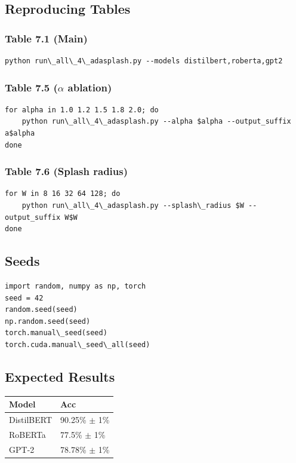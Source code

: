 \subsection{Reproducing Tables}

\subsubsection{Table 7.1 (Main)}
\begin{lstlisting}
python run\_all\_4\_adasplash.py --models distilbert,roberta,gpt2
\end{lstlisting}

\subsubsection{Table 7.5 ($\alpha$ ablation)}
\begin{lstlisting}
for alpha in 1.0 1.2 1.5 1.8 2.0; do
    python run\_all\_4\_adasplash.py --alpha $alpha --output_suffix a$alpha
done
\end{lstlisting}

\subsubsection{Table 7.6 (Splash radius)}
\begin{lstlisting}
for W in 8 16 32 64 128; do
    python run\_all\_4\_adasplash.py --splash\_radius $W --output_suffix W$W
done
\end{lstlisting}

\subsection{Seeds}

\begin{lstlisting}
import random, numpy as np, torch
seed = 42
random.seed(seed)
np.random.seed(seed)
torch.manual\_seed(seed)
torch.cuda.manual\_seed\_all(seed)
\end{lstlisting}

\subsection{Expected Results}

\begin{table}[H]
\centering
\small
\begin{tabular}{ll}
\toprule
\textbf{Model} & \textbf{Acc} \\
\midrule
DistilBERT & 90.25\% $\pm$ 1\% \\
RoBERTa & 77.5\% $\pm$ 1\% \\
GPT-2 & 78.78\% $\pm$ 1\% \\
\bottomrule
\end{tabular}
\end{table}

